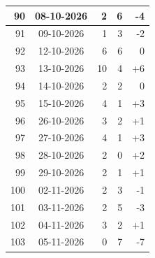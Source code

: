 \begin{longtable}{|r|c|r|r|r|}
90 & 08-10-2026 & 2 & 6 & -4 \\ \hline
91 & 09-10-2026 & 1 & 3 & -2 \\ \hline
92 & 12-10-2026 & 6 & 6 & 0 \\ \hline
93 & 13-10-2026 & 10 & 4 & +6 \\ \hline
94 & 14-10-2026 & 2 & 2 & 0 \\ \hline
95 & 15-10-2026 & 4 & 1 & +3 \\ \hline
96 & 26-10-2026 & 3 & 2 & +1 \\ \hline
97 & 27-10-2026 & 4 & 1 & +3 \\ \hline
98 & 28-10-2026 & 2 & 0 & +2 \\ \hline
99 & 29-10-2026 & 2 & 1 & +1 \\ \hline
100 & 02-11-2026 & 2 & 3 & -1 \\ \hline
101 & 03-11-2026 & 2 & 5 & -3 \\ \hline
102 & 04-11-2026 & 3 & 2 & +1 \\ \hline
103 & 05-11-2026 & 0 & 7 & -7 \\ \hline
\end{longtable}

\normalsize


